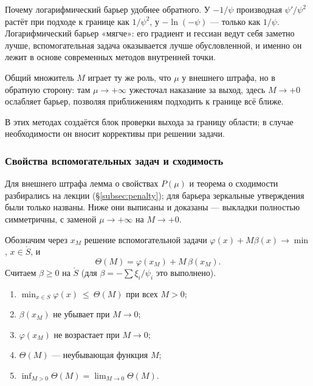 \begin{idea}
Почему логарифмический барьер удобнее обратного. У $-1/\psi$ производная
$\psi'/\psi^2$ растёт при подходе к границе как $1/\psi^2$, у
$-\ln(-\psi)$ — только как $1/\psi$. Логарифмический барьер «мягче»: его
градиент и гессиан ведут себя заметно лучше, вспомогательная задача
оказывается лучше обусловленной, и именно он лежит в основе современных
методов внутренней точки.

Общий множитель $M$ играет ту же роль, что $\mu$ у внешнего штрафа, но в
обратную сторону: там $\mu \to +\infty$ ужесточал наказание за выход, здесь
$M \to +0$ ослабляет барьер, позволяя приближениям подходить к границе всё
ближе.
\end{idea}

\begin{remark}
В этих методах создаётся блок проверки выхода за границу области; в случае
необходимости он вносит коррективы при решении задачи.
\end{remark}

\subsubsection*{Свойства вспомогательных задач и сходимость}

\begin{idea}[title={Откуда этот материал}]
Для внешнего штрафа лемма о свойствах $P(\mu)$ и теорема о сходимости
разбирались на лекции (\S\ref{subsec:penalty}); для барьера зеркальные
утверждения были только названы. Ниже они выписаны и доказаны — выкладки
полностью симметричны, с заменой $\mu \to +\infty$ на $M \to +0$.
\end{idea}

Обозначим через $x_M$ решение вспомогательной задачи
$\varphi(x) + M\beta(x) \to \min$, $x \in \mathring{S}$, и
\[
  \Theta(M) = \varphi(x_M) + M\,\beta(x_M) .
\]
Считаем $\beta \ge 0$ на $\mathring{S}$ (для $\beta = -\sum \xi_i/\psi_i$ это
выполнено).

\begin{lemma}\label{lem:barrier}
\begin{enumerate}[label=\arabic*),left=0pt,nosep]
  \item $\displaystyle\min_{x \in S}\varphi(x) \ \le\ \Theta(M)$ при всех $M > 0$;
  \item $\beta(x_M)$ не убывает при $M \to 0$;
  \item $\varphi(x_M)$ не возрастает при $M \to 0$;
  \item $\Theta(M)$ — неубывающая функция $M$;
  \item $\displaystyle\inf_{M>0}\Theta(M) = \lim_{M \to 0}\Theta(M)$.
\end{enumerate}
\end{lemma}

